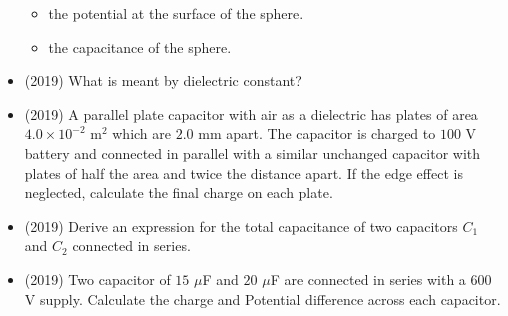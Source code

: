 \documentclass{article}
\begin{document}
\begin{itemize}
 \begin{itemize}
\item the potential at the surface of the sphere. 
\item the capacitance of the sphere. 
\end{itemize}
\item (2019)  What is meant by dielectric constant? 
\item (2019)  A parallel plate capacitor with air as a dielectric has plates of area $ 4.0 \times 10^{-2}$ m$ ^{2}$ which are $ 2.0$ mm apart. The capacitor is charged to $ 100$ V battery and connected in parallel with a similar unchanged capacitor with plates of half the area and twice the distance apart. If the edge effect is neglected, calculate the final charge on each plate. 
\item (2019)  Derive an expression for the total capacitance of two capacitors $ C_{1}$ and $ C_{2}$ connected in series. 
\item (2019)  Two capacitor of $ 15$ $\mu$F and $ 20$ $\mu$F are connected in series with a $ 600$ V supply.  Calculate the charge and Potential difference across each capacitor. 
\end{itemize}
\end{document}

